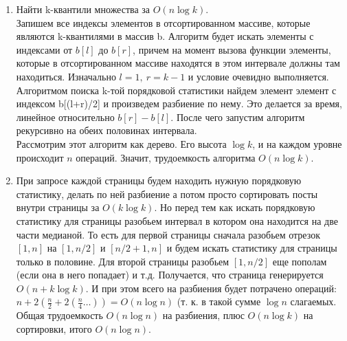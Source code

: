 \documentclass[10pt]{article}
\begin{document}
\begin{enumerate}
	\item Найти k-квантили множества за $O(n \log k)$.\\
	Запишем все индексы элементов в отсортированном массиве, которые являются k-квантилями в массив b. Алгоритм будет искать элементы с индексами от $b[l]$ до $b[r]$, причем на момент вызова функции элементы, которые в отсортированном массиве находятся в этом интервале должны там находиться. Изначально $l=1,\ r=k-1$ и условие очевидно выполняется.\\
	Алгоритмом поиска k-той порядковой статистики найдем элемент элемент с индексом b[(l+r)/2] и произведем разбиение по нему. Это делается за время, линейное относительно $b[r] - b[l]$. После чего запустим алгоритм рекурсивно на обеих половинах интервала.\\
	Рассмотрим этот алгоритм как дерево. Его высота $\log k$, и на каждом уровне происходит $n$ операций. Значит, трудоемкость алгоритма $O(n \log k)$.
	
	\item При запросе каждой страницы будем находить нужную порядковую статистику, делать по ней разбиение а потом просто сортировать посты внутри страницы за $O(k \log k)$. Но перед тем как искать порядковую статистику для страницы разобьем интервал в котором она находится на две части медианой. То есть для первой страницы сначала разобьем отрезок $[1, n]$ на $[1, n/2]$ и $[n/2+1, n]$ и будем искать статистику для страницы только в половине. Для второй страницы разобьем $[1, n/2]$ еще пополам (если она в него попадает) и т.д. Получается, что страница генерируется $O(n + k \log k)$. И при этом всего на разбиения будет потрачено операций:\\
	$n +2(\frac{n}{2} + 2(\frac{n}{4} \ldots )) = O(n \log n)$ (т. к. в такой сумме $\log n$ слагаемых.\\
	Общая трудоемкость $O(n \log n)$ на разбиения, плюс $O(n \log k)$ на сортировки, итого $O(n \log n)$.
\end{enumerate}
\end{document}
